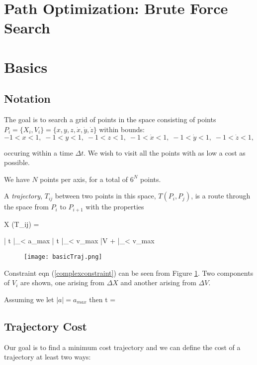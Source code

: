 \documentclass[letterpaper]{article}
\begin{document}
\section*{Path Optimization: Brute Force Search}

\section{Basics}

\subsection{Notation}
The goal is to search a grid of points in the  space consisting of points  $P_i = \{X_i, V_i\} = \{x,y,z,\dot{x},\dot{y},\dot{z}\}$ within bounds:
\[
-1 < x < 1, \;
-1 < y < 1, \;
-1 < z < 1, \;
-1 < \dot{x} < 1, \;
-1 < \dot{y} < 1, \;
-1 < \dot{z} < 1, \;
\]

occuring within a time $\Delta t$.    We wish to visit all the points with as low a cost as possible.

We have $N$ points per axis, for a total of $6^N$ points.

A {\it trajectory}, $T_{ij}$ between two points in this space, $T(P_i,P_j)$, is a route through
the space from $P_i$ to $P_{i+1}$ with the properties

\beq \label{firstconstraint}
\Delta X (T_{ij}) = 
\eeq

\beq
|  {\Delta t} |_\infty  < a_{max}
\eeq
\beq
|  {\Delta t} |_\infty < v_{max}
\eeq
\beq \label{complexconstraint}\label{lastconstraint}
|\Delta V +   |_\infty < v_{max}
\eeq

\begin{figure}\centering
  \texttt{[image: basicTraj.png]}
  \caption{}\label{basicTraj}
\end{figure}
Constraint eqn (\ref{complexconstraint}) can be seen from Figure \ref{basicTraj}.   Two components of ${V}_i$
are shown, one arising from $\Delta X$ and another arising from $\Delta V$.

Assuming we let $|a| = a_{max}$ then
\beq
\Delta t = 
\eeq\label{deltat}

\subsection{Trajectory Cost}
Our goal is to find a minimum cost trajectory and we can define the cost of a trajectory at least two ways:
\end{document}

